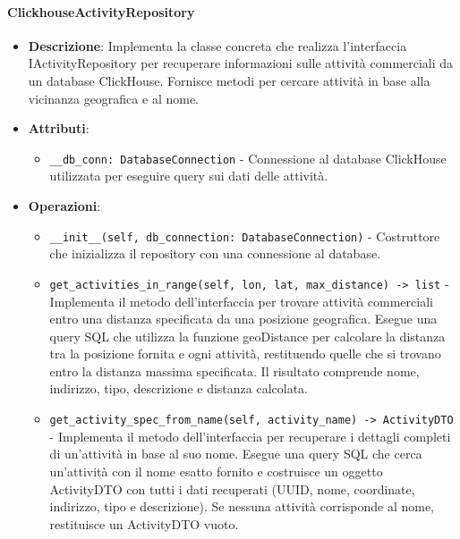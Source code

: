 \documentclass[10pt]{article}
\begin{document}
    \paragraph{ClickhouseActivityRepository}
    \begin{itemize} 
    \item \textbf{Descrizione}: Implementa la classe concreta che realizza l'interfaccia IActivityRepository per recuperare informazioni sulle attività commerciali da un database ClickHouse. Fornisce metodi per cercare attività in base alla vicinanza geografica e al nome.
    \item \textbf{Attributi}:
    \begin{itemize}
        \item \texttt{\_\_db\_conn: DatabaseConnection} - Connessione al database ClickHouse utilizzata per eseguire query sui dati delle attività.
    \end{itemize}
    
    \item \textbf{Operazioni}:
    \begin{itemize}
        \item \texttt{\_\_init\_\_(self, db\_connection: DatabaseConnection)} - Costruttore che inizializza il repository con una connessione al database.
        
        \item \texttt{get\_activities\_in\_range(self, lon, lat, max\_distance) -> list} - Implementa il metodo dell'interfaccia per trovare attività commerciali entro una distanza specificata da una posizione geografica. Esegue una query SQL che utilizza la funzione geoDistance per calcolare la distanza tra la posizione fornita e ogni attività, restituendo quelle che si trovano entro la distanza massima specificata. Il risultato comprende nome, indirizzo, tipo, descrizione e distanza calcolata.
        
        \item \texttt{get\_activity\_spec\_from\_name(self, activity\_name) -> ActivityDTO} - Implementa il metodo dell'interfaccia per recuperare i dettagli completi di un'attività in base al suo nome. Esegue una query SQL che cerca un'attività con il nome esatto fornito e costruisce un oggetto ActivityDTO con tutti i dati recuperati (UUID, nome, coordinate, indirizzo, tipo e descrizione). Se nessuna attività corrisponde al nome, restituisce un ActivityDTO vuoto.
    \end{itemize}
    \end{itemize}
    
\end{document}
